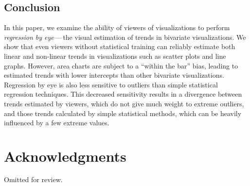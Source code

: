 \documentclass{sigchi}
\begin{document}
\subsection{Conclusion}

In this paper, we examine the ability of viewers of visualizations to perform \emph{regression by eye}\,---\,the visual estimation of trends in bivariate visualizations. We show that even viewers without statistical training can reliably estimate both linear and non-linear trends in visualizations such as scatter plots and line graphs. However, area charts are subject to a ``within the bar'' bias, leading to estimated trends with lower intercepts than other bivariate visualizations. Regression by eye is also less sensitive to outliers than simple statistical regression techniques. This decreased sensitivity results in a divergence between trends estimated by viewers, which do not give much weight to extreme outliers, and those trends calculated by simple statistical methods, which can be heavily influenced by a few extreme values.


\section{Acknowledgments}

Omitted for review.

%
%
%
%
%
\balance{}




\end{document}

